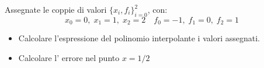 Assegnate le coppie di valori $\{x_i,f_i \}_{i=0}^2$, con:
\[
x_0=0, \; x_1=1, \; x_2=2 \quad f_0=-1, \; f_1=0, \; f_2=1
\]
\begin{itemize}
\item  Calcolare l'espressione del polinomio interpolante i
valori assegnati.
\item Calcolare l' errore nel punto $x=1/2$

\end{itemize}

